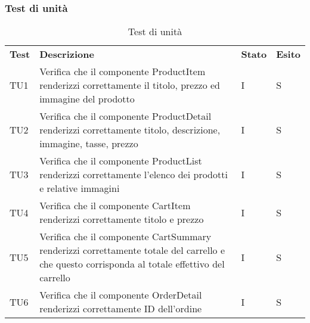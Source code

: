 \subsubsection{Test di unità}
\begin{center}
    \centering
    \renewcommand{\arraystretch}{1.8}
    \label{tab:TestUnita}
    \begin{longtable}[!h]{p{45px} p{255px} p{35px} p{35px}}
        \caption{Test di unità}                                                                                                                                                                                                                            \\
        \rowcolor{logo!70}
        \textbf{Test} & \textbf{Descrizione}                                                                                                                                                                             & \textbf{Stato} & \textbf{Esito} \\
        TU1           & Verifica che il componente ProductItem renderizzi correttamente il titolo, prezzo ed immagine del prodotto                                                                                       & I              & S              \\
        TU2           & Verifica che il componente ProductDetail renderizzi correttamente titolo, descrizione, immagine, tasse, prezzo                                                                                   & I              & S              \\
        TU3           & Verifica che il componente ProductList renderizzi correttamente l'elenco dei prodotti e relative immagini                                                                                        & I              & S              \\
        TU4           & Verifica che il componente CartItem renderizzi correttamente titolo e prezzo                                                                                                                     & I              & S              \\
        TU5           & Verifica che il componente CartSummary renderizzi correttamente totale del carrello \newline e che questo corrisponda al totale effettivo del carrello                                           & I              & S              \\
        TU6           & Verifica che il componente OrderDetail renderizzi correttamente ID dell'ordine                                                                                                                   & I              & S              \\

\end{longtable}
\end{center}
